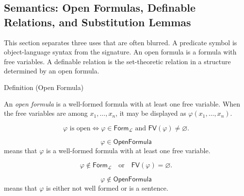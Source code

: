 
\subsection{Semantics: Open Formulas, Definable Relations, and Substitution Lemmas}

\begin{remark*}
This section separates three uses that are often blurred. A predicate symbol
is object-language syntax from the signature. An open formula is a formula
with free variables. A definable relation is the set-theoretic relation in a
structure determined by an open formula.
\end{remark*}

\begin{definitionbox}{Definition (Open Formula)}
\begin{definition}
\label{def:predicate}
An \emph{open formula} is a well-formed formula with at least one free
variable. When the free variables are among \(x_1,\ldots,x_n\), it may be
displayed as \(\varphi(x_1,\ldots,x_n)\).
\end{definition}
\end{definitionbox}

\begin{remark*}
\[
\varphi \text{ is open}
\Longleftrightarrow
\varphi\in\mathsf{Form}_{\mathcal L}
\text{ and }
\mathsf{FV}(\varphi)\neq\varnothing.
\]
\end{remark*}

\begin{remark*}
\[
  \varphi\in\mathsf{OpenFormula}
\] means that \(\varphi\) is a
well-formed formula with at least one free variable.
\end{remark*}

\begin{remark*}
\[
\varphi\notin\mathsf{Form}_{\mathcal L}
\quad\text{or}\quad
\mathsf{FV}(\varphi)=\varnothing.
\]
\end{remark*}

\begin{remark*}
\[
  \varphi\notin\mathsf{OpenFormula}
\] means that \(\varphi\) is either
not well formed or is a sentence.
\end{remark*}

